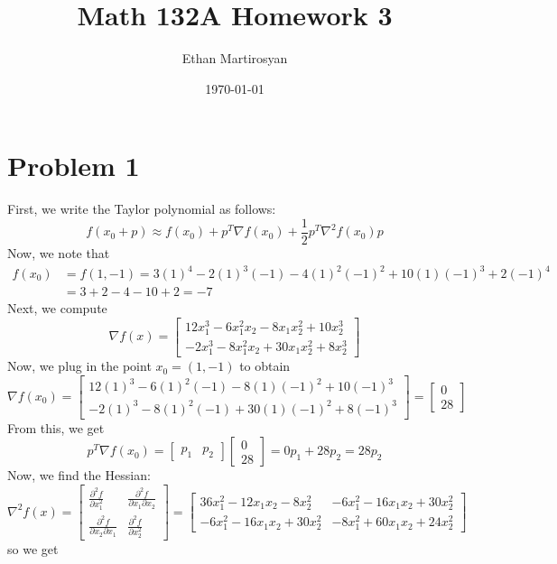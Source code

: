 \documentclass[12pt]{article}
\begin{document}
 
\title{Math 132A Homework 3}
\author{Ethan Martirosyan}
\date{\today}
\maketitle
{}
\hfuzz=50pt
\section*{Problem 1}
First, we write the Taylor polynomial as follows:
\[
f(x_0 + p) \approx f(x_0) + p^T \nabla f(x_0) + \frac{1}{2} p^T \nabla^2 f(x_0) p
\] Now, we note that
\begin{align*}
f(x_0) &= f(1,-1) = 3(1)^4 - 2(1)^3(-1)-4(1)^2(-1)^2 + 10(1)(-1)^3 + 2(-1)^4\\
&= 3 + 2 - 4 - 10 + 2 = -7
\end{align*}
Next, we compute
\[
\nabla f(x) = 
\begin{bmatrix}
12x_1^3 - 6x_1^2x_2 - 8x_1x_2^2 + 10x_2^3\\
-2x_1^3 - 8x_1^2x_2 + 30x_1x_2^2 + 8x_2^3
\end{bmatrix}
\] Now, we plug in the point $x_0 = (1,-1)$ to obtain
\[
\nabla f(x_0) = 
\begin{bmatrix}
12(1)^3 - 6(1)^2(-1) - 8(1)(-1)^2 + 10(-1)^3\\
-2(1)^3 - 8(1)^2(-1) + 30(1)(-1)^2 + 8(-1)^3
\end{bmatrix}
=
\begin{bmatrix}
0\\
28
\end{bmatrix}
\] From this, we get
\[
p^T \nabla f(x_0) =
\begin{bmatrix}
p_1 & p_2
\end{bmatrix}
\begin{bmatrix}
0\\
28
\end{bmatrix} = 0p_1 + 28p_2 = 28p_2
\] Now, we find the Hessian:
\[
\nabla^2 f(x) =
\begin{bmatrix}
\frac{\partial^2 f}{\partial x_1^2} & \frac{\partial^2 f}{\partial x_1 \partial x_2}\\
\frac{\partial^2 f}{\partial x_2 \partial x_1} & \frac{\partial^2 f}{\partial x_2^2}
\end{bmatrix}
= \begin{bmatrix}
36x_1^2 -12x_1x_2 - 8x_2^2 & -6x_1^2 - 16x_1x_2 + 30x_2^2\\
-6x_1^2 - 16x_1x_2 + 30x_2^2 & -8x_1^2 + 60x_1x_2 + 24x_2^2
\end{bmatrix}
\] so we get
\end{document}
